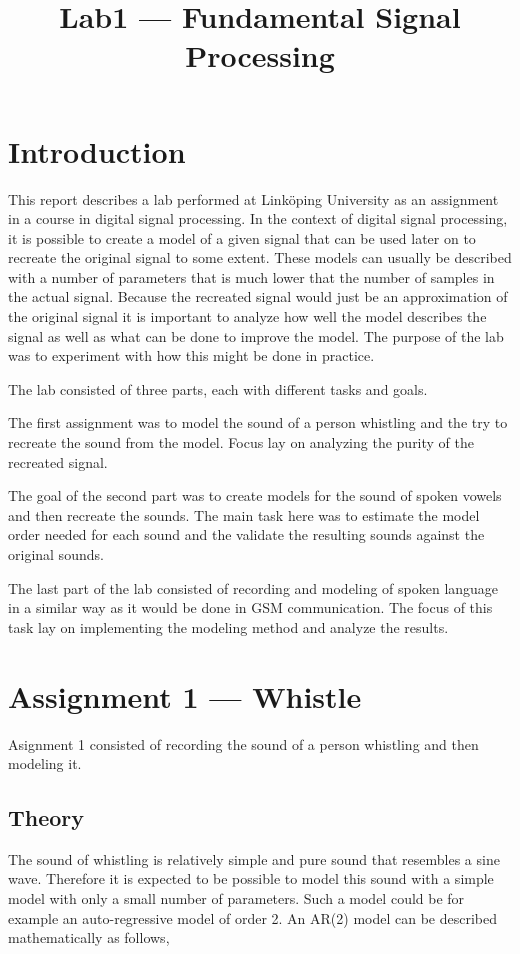 \documentclass{IEEEtran}
\begin{document}
\title{Lab1 --- Fundamental Signal Processing}

\maketitle

\section{Introduction}
This report describes a lab performed at Linköping University as an
assignment in a course in digital signal processing. In the context of
digital signal processing, it is possible to create a model of a given
signal that can be used later on to recreate the original signal to some
extent. These models can usually be described with a number of parameters
that is much lower that the number of samples in the actual signal. Because
the recreated signal would just be an approximation of the original signal
it is important to analyze how well the model describes the signal as well
as what can be done to improve the model. The purpose of the lab was
to experiment with how this might be done in practice.

The lab consisted of three parts, each with different tasks and
goals.

The first assignment was to model the sound of a person whistling and the
try to recreate the sound from the model. Focus lay on analyzing the purity
of the recreated signal.

The goal of the second part was to create models for the sound of spoken
vowels and then recreate the sounds. The main task here was to estimate
the model order needed for each sound and the validate the resulting
sounds against the original sounds.

The last part of the lab consisted of recording and modeling of
spoken language in a similar way as it would be done in GSM communication.
The focus of this task lay on implementing the modeling method and analyze
the results.

\section{Assignment 1 --- Whistle}
Asignment 1 consisted of recording the sound of a person whistling and then
modeling it.

\subsection{Theory}
\label{sec:whistletheory}
The sound of whistling is relatively simple and pure sound that resembles
a sine wave. Therefore it is expected to be possible to model this sound
with a simple model with only a small number of parameters. Such a model
could be for example an auto-regressive model of order 2. An AR(2) model
can be described mathematically as follows,
\end{document}
